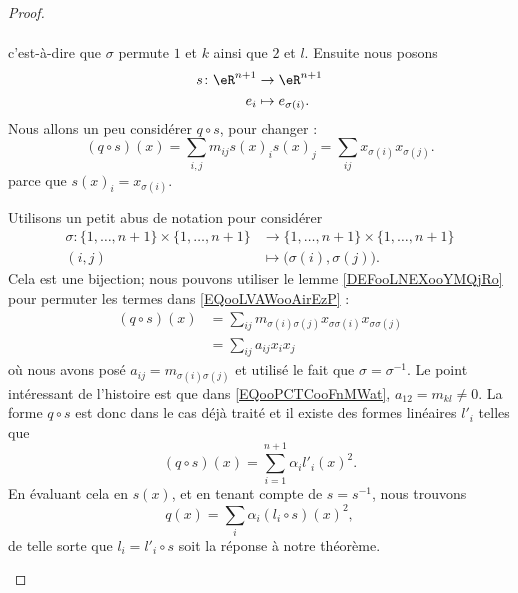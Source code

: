 \begin{proof}
\begin{subproof}
\begin{equation}
\begin{aligned}
			\end{aligned}
		\end{equation}
		c'est-à-dire que \( \sigma\) permute \( 1\) et \( k\) ainsi que \( 2\) et \( l\). Ensuite nous posons
		\begin{equation}
			\begin{aligned}
				s\colon \eR^{n+1} & \to \eR^{n+1}          \\
				e_i               & \mapsto e_{\sigma(i)}.
			\end{aligned}
		\end{equation}
		Nous allons un peu considérer \( q\circ s\), pour changer :
		\begin{equation}        \label{EQooLVAWooAirEzP}
			(q\circ s)(x)=\sum_{i,j}m_{ij}s(x)_is(x)_j=\sum_{ij}x_{\sigma(i)}x_{\sigma(j)}.
		\end{equation}
		parce que \( s(x)_i=x_{\sigma(i)}\).

		Utilisons un petit abus de notation pour considérer
		\begin{equation}
			\begin{aligned}
				\sigma\colon \{ 1,\ldots, n+1 \}\times \{ 1,\ldots, n+1 \} & \to \{ 1,\ldots, n+1 \}\times \{ 1,\ldots, n+1 \} \\
				(i,j)                                                      & \mapsto \big(\sigma(i), \sigma(j)\big).
			\end{aligned}
		\end{equation}
		Cela est une bijection; nous pouvons utiliser le lemme \ref{DEFooLNEXooYMQjRo} pour permuter les termes dans \eqref{EQooLVAWooAirEzP} :
		\begin{subequations}
			\begin{align}
				(q\circ s)(x) & =\sum_{ij}m_{\sigma(i)\sigma(j)}x_{\sigma\sigma(i)}x_{\sigma\sigma(j)} \\
				              & =\sum_{ij}a_{ij}x_ix_j     \label{EQooPCTCooFnMWat}
			\end{align}
		\end{subequations}
		où nous avons posé \( a_{ij}=m_{\sigma(i)\sigma(j)}\) et utilisé le fait que \( \sigma=\sigma^{-1}\). Le point intéressant de l'histoire est que dans \eqref{EQooPCTCooFnMWat}, \( a_{12}=m_{kl}\neq 0\). La forme \( q\circ s\) est donc dans le cas déjà traité et il existe des formes linéaires \( l'_i\) telles que
		\begin{equation}
			(q\circ s)(x)=\sum_{i=1}^{n+1}\alpha_il'_i(x)^2.
		\end{equation}
		En évaluant cela en \( s(x)\), et en tenant compte de \( s=s^{-1}\), nous trouvons
		\begin{equation}
			q(x)=\sum_i\alpha_i(l_i\circ s)(x)^2,
		\end{equation}
		de telle sorte que \( l_i=l'_i\circ s\) soit la réponse à notre théorème.
	\end{subproof}
\end{proof}

